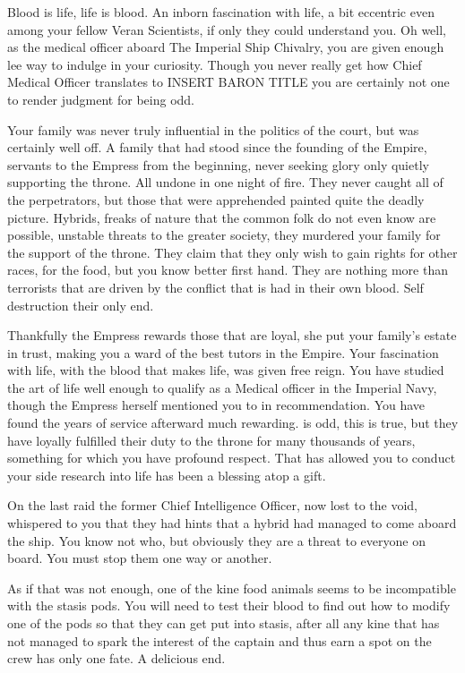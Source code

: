 \documentclass[char]{guildcamp4}
\begin{document}
\name{\cVthree{}}

Blood is life, life is blood.
An inborn fascination with life, a bit eccentric even among your fellow Veran Scientists, if only they could understand you. Oh well, as the 
medical officer aboard The Imperial Ship Chivalry, you are given enough lee way to indulge in your curiosity. Though you never really get how 
Chief Medical Officer translates to INSERT BARON TITLE you are certainly not one to render judgment for being odd.

Your family was never truly influential in the politics of the court, but was certainly well off. A family that had stood since the founding of the Empire, servants to the Empress from the beginning, never seeking glory only quietly supporting the throne. All undone in one night of fire. They never caught all of the perpetrators, but those that were apprehended painted quite the deadly picture. Hybrids, freaks of nature that the common folk do not even know are possible, unstable threats to the greater society, they murdered your family for the support of the throne. They claim that they only wish to gain rights for other races, for the food, but you know better first hand. They are nothing more than terrorists that are driven by the conflict that is had in their own blood. Self destruction their only end. 

Thankfully the Empress rewards those that are loyal, she put your family's estate in trust, making you a ward of the best tutors in the Empire. Your fascination with life, with the blood that makes life, was given free reign. You have studied the art of life well enough to qualify as a Medical officer in the Imperial Navy, though the Empress herself mentioned you to \cVone{} in recommendation. You have found the years of service afterward much rewarding. \cVone{} is odd, this is true, but they have loyally fulfilled their duty to the throne for many thousands of years, something for which you have profound respect. That \cVone{} has allowed you to conduct your side research into life has been a blessing atop a gift. 

On the last raid the former Chief Intelligence Officer, now lost to the void, whispered to you that they had hints that a hybrid had managed to come aboard the ship. You know not who, but obviously they are a threat to everyone on board. You must stop them one way or another.

As if that was not enough, one of the kine food animals seems to be incompatible with the stasis pods. You will need to test their blood to find out how to modify one of the pods so that they can get put into stasis, after all any kine that has not managed to spark the interest of the captain and thus earn a spot on the crew has only one fate. A delicious end. 
\end{document}
